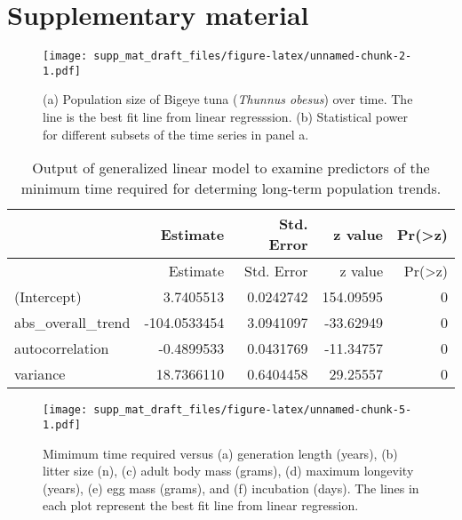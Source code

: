 \documentclass[12pt,]{article}
\begin{document}
\section{Supplementary material}\label{supplementary-material}

\setcounter{figure}{0} \renewcommand{\thefigure}{S\arabic{figure}}

\begin{figure}[htbp]
\centering
\texttt{[image: supp\_mat\_draft\_files/figure-latex/unnamed-chunk-2-1.pdf]}
\caption{(a) Population size of Bigeye tuna (\emph{Thunnus obesus}) over
time. The line is the best fit line from linear regresssion. (b)
Statistical power for different subsets of the time series in panel
a.\label{fig:empirical_approach_example}}
\end{figure}

\begin{longtable}[]{@{}lrrrr@{}}
\caption{Output of generalized linear model to examine predictors of the
minimum time required for determing long-term population
trends.\label{table:model_output}}\tabularnewline
\toprule
& Estimate & Std. Error & z value &
Pr(\textgreater{}\textbar{}z\textbar{})\tabularnewline
\midrule
\endfirsthead
\toprule
& Estimate & Std. Error & z value &
Pr(\textgreater{}\textbar{}z\textbar{})\tabularnewline
\midrule
\endhead
(Intercept) & 3.7405513 & 0.0242742 & 154.09595 & 0\tabularnewline
abs\_overall\_trend & -104.0533454 & 3.0941097 & -33.62949 &
0\tabularnewline
autocorrelation & -0.4899533 & 0.0431769 & -11.34757 & 0\tabularnewline
variance & 18.7366110 & 0.6404458 & 29.25557 & 0\tabularnewline
\bottomrule
\end{longtable}

\begin{figure}[htbp]
\centering
\texttt{[image: supp\_mat\_draft\_files/figure-latex/unnamed-chunk-5-1.pdf]}
\caption{Mimimum time required versus (a) generation length (years), (b)
litter size (n), (c) adult body mass (grams), (d) maximum longevity
(years), (e) egg mass (grams), and (f) incubation (days). The lines in
each plot represent the best fit line from linear
regression.\label{fig:biological_correlates}}
\end{figure}
\end{document}
